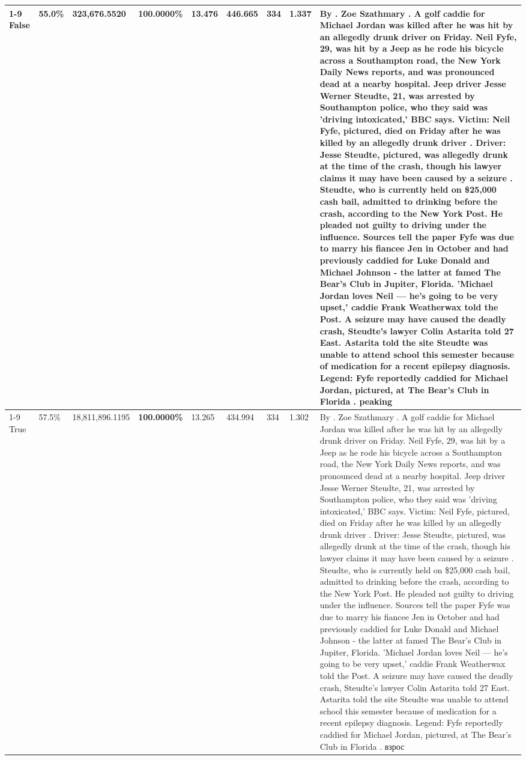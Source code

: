 \begin{table}[H]
\begin{tabular}{lllrlllll}
\cline{1-9}
False & 55.0\% & 323,676.5520 & \bfseries \color{red} 100.0000\% & 13.476 & 446.665 & 334 & 1.337 & By . Zoe Szathmary . A golf caddie for Michael Jordan was killed after he was hit by an allegedly drunk driver on Friday. Neil Fyfe, 29, was hit by a Jeep as he rode his bicycle across a Southampton road, the New York Daily News reports, and was pronounced dead at a nearby hospital. Jeep driver Jesse Werner Steudte, 21, was arrested by Southampton police, who they said was 'driving intoxicated,' BBC says. Victim: Neil Fyfe, pictured, died on Friday after he was killed by an allegedly drunk driver . Driver: Jesse Steudte, pictured, was allegedly drunk at the time of the crash, though his lawyer claims it may have been caused by a seizure . Steudte, who is currently held on \$25,000 cash bail, admitted to drinking before the crash, according to the New York Post. He pleaded not guilty to driving under the influence. Sources tell the paper Fyfe was due to marry his fiancee Jen in October and had previously caddied for Luke Donald and Michael Johnson - the latter at famed The Bear's Club in Jupiter, Florida. 'Michael Jordan loves Neil — he’s going to be very upset,' caddie Frank Weatherwax told the Post. A seizure may have caused the deadly crash, Steudte's lawyer Colin Astarita told 27 East. Astarita told the site Steudte was unable to attend school this semester because of medication for a recent epilepsy diagnosis. Legend: Fyfe reportedly caddied for Michael Jordan, pictured, at The Bear's Club in Florida . peaking \\
\cline{1-9}
True & 57.5\% & 18,811,896.1195 & \bfseries \color{red} 100.0000\% & 13.265 & 434.994 & 334 & 1.302 & By . Zoe Szathmary . A golf caddie for Michael Jordan was killed after he was hit by an allegedly drunk driver on Friday. Neil Fyfe, 29, was hit by a Jeep as he rode his bicycle across a Southampton road, the New York Daily News reports, and was pronounced dead at a nearby hospital. Jeep driver Jesse Werner Steudte, 21, was arrested by Southampton police, who they said was 'driving intoxicated,' BBC says. Victim: Neil Fyfe, pictured, died on Friday after he was killed by an allegedly drunk driver . Driver: Jesse Steudte, pictured, was allegedly drunk at the time of the crash, though his lawyer claims it may have been caused by a seizure . Steudte, who is currently held on \$25,000 cash bail, admitted to drinking before the crash, according to the New York Post. He pleaded not guilty to driving under the influence. Sources tell the paper Fyfe was due to marry his fiancee Jen in October and had previously caddied for Luke Donald and Michael Johnson - the latter at famed The Bear's Club in Jupiter, Florida. 'Michael Jordan loves Neil — he’s going to be very upset,' caddie Frank Weatherwax told the Post. A seizure may have caused the deadly crash, Steudte's lawyer Colin Astarita told 27 East. Astarita told the site Steudte was unable to attend school this semester because of medication for a recent epilepsy diagnosis. Legend: Fyfe reportedly caddied for Michael Jordan, pictured, at The Bear's Club in Florida . взрос \\

\end{tabular}
\end{table}
